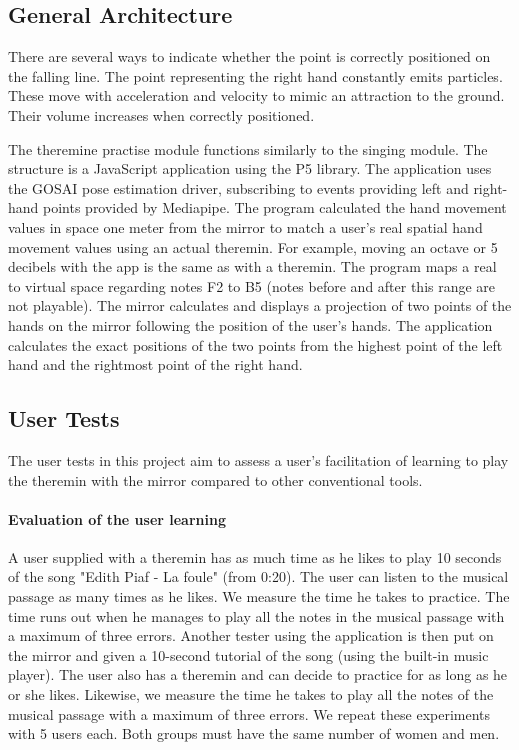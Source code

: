\subsection{General Architecture}

There are several ways to indicate whether the point is correctly positioned on the falling line.
The point representing the right hand constantly emits particles. These move with acceleration and velocity to mimic an attraction to the ground. Their volume increases when correctly positioned.

The theremine practise module functions similarly to the singing module. The structure is a JavaScript application using the P5 library. The application uses the GOSAI pose estimation driver, subscribing to events providing left and right-hand points provided by Mediapipe.
The program calculated the hand movement values in space one meter from the mirror to match a user's real spatial hand movement values using an actual theremin. For example, moving an octave or 5 decibels with the app is the same as with a theremin. The program maps a real to virtual space regarding notes F2 to B5 (notes before and after this range are not playable). The mirror calculates and displays a projection of two points of the hands on the mirror following the position of the user's hands.
The application calculates the exact positions of the two points from the highest point of the left hand and the rightmost point of the right hand.

\subsection*{User Tests}

The user tests in this project aim to assess a user’s facilitation of learning to play the theremin with the mirror compared to other conventional tools.

\paragraph{Evaluation of the user learning}

A user supplied with a theremin has as much time as he likes to play 10 seconds of the song "Edith Piaf - La foule" (from 0:20). The user can listen to the musical passage as many times as he likes. We measure the time he takes to practice. The time runs out when he manages to play all the notes in the musical passage with a maximum of three errors. 
Another tester using the application is then put on the mirror and given a 10-second tutorial of the song (using the built-in music player). The user also has a theremin and can decide to practice for as long as he or she likes. Likewise, we measure the time he takes to play all the notes of the musical passage with a maximum of three errors.
We repeat these experiments with 5 users each. Both groups must have the same number of women and men.

